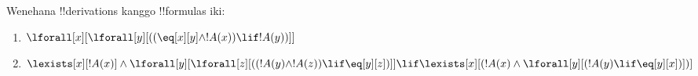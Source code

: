 \documentclass[../../../include/open-logic-section]{subfiles}
\begin{document}
\begin{prob}
Wenehana !!{derivation}s kanggo !!{formula}s iki:
\begin{enumerate}
\item $\lforall[x][\lforall[y][((\eq[x][y] \land !A(x)) \lif !A(y))]]$
\item $\lexists[x][!A(x)] \land \lforall[y][\lforall[z][((!A(y) \land
    !A(z)) \lif \eq[y][z])]] \lif \lexists[x][(!A(x) \land
  \lforall[y][(!A(y) \lif \eq[y][x])])]$
\end{enumerate}
\end{prob}
\end{document}
